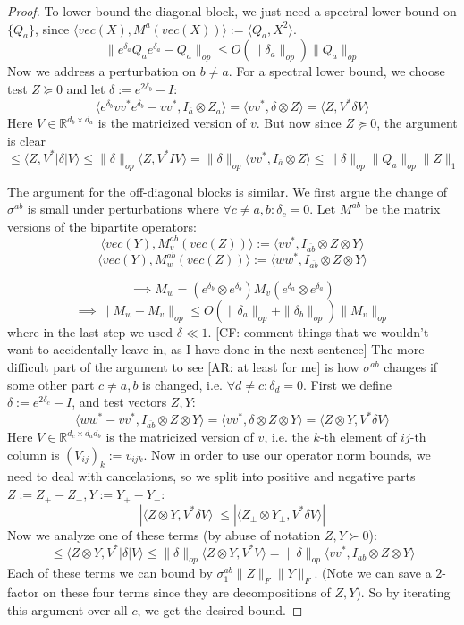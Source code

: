 \documentclass{article}
\newcommand{\R}{{\mathbb{R}}}
\newcommand{\CF}[1]{{\color{purple}[CF: #1]}}
\newcommand{\AR}[1]{{\color{orange}[AR: #1]}}
\begin{document}
\begin{proof}
To lower bound the diagonal block, we just need a spectral lower bound on $\{Q_{a}\}$, since $\langle vec(X), M^{a} (vec(X)) \rangle := \langle Q_{a}, X^{2} \rangle$.
\[ \| e^{\delta_{a}} Q_{a} e^{\delta_{a}} - Q_{a}\|_{op} \leq O(\|\delta_{a}\|_{op}) \|Q_{a}\|_{op}   \]
Now we address a perturbation on $b \neq a$. For a spectral lower bound, we choose test $Z \succeq 0$ and let $\delta := e^{2\delta_{b}} - I$:
\[ \langle e^{\delta_{b}} v v^{*} e^{\delta_{b}} - v v^{*}, I_{\overline{a}} \otimes Z_{a} \rangle
= \langle v v^{*}, \delta \otimes Z \rangle = \langle Z, V^{*} \delta V \rangle   \]
Here $V \in \R^{d_{b} \times d_{a}}$ is the matricized version of $v$. But now since $Z \succeq 0$, the argument is clear
\[ \leq \langle Z, V^{*} |\delta| V \rangle \leq \|\delta\|_{op} \langle Z, V^{*} I V \rangle = \|\delta\|_{op} \langle v v^{*}, I_{\overline{a}} \otimes Z \rangle \leq \|\delta\|_{op} \|Q_{a}\|_{op} \|Z\|_{1}    \]

The argument for the off-diagonal blocks is similar. We first argue the change of $\sigma^{ab}$ is small under perturbations where $\forall c \neq a,b: \delta_{c} = 0$. Let $M^{ab}$ be the matrix versions of the bipartite operators:
\[ \langle vec(Y), M_{v}^{ab}(vec(Z)) \rangle := \langle v v^{*}, I_{\overline{ab}} \otimes Z \otimes Y \rangle \]
\[ \langle vec(Y), M_{w}^{ab}(vec(Z)) \rangle := \langle w w^{*}, I_{\overline{ab}} \otimes Z \otimes Y \rangle\]

\[ \implies M_{w} = (e^{\delta_{b}} \otimes e^{\delta_{b}}) M_{v} (e^{\delta_{a}} \otimes e^{\delta_{a}})   \]
\[ \implies \|M_{w} - M_{v}\|_{op} \leq O(\|\delta_{a}\|_{op} + \|\delta_{b}\|_{op}) \|M_{v}\|_{op}   \]
where in the last step we used $\delta \ll 1$.
\CF{comment things that we wouldn't want to accidentally leave in, as I have done in the next sentence}
The more difficult part of the argument to see \AR{at least for me} is how $\sigma^{ab}$ changes if some other part $c \neq a,b$ is changed, i.e. $\forall d \neq c: \delta_{d} = 0$. First we define $\delta := e^{2 \delta_{c}} - I$, and test vectors $Z,Y$:
\[ \langle w w^{*} - v v^{*}, I_{\overline{ab}} \otimes Z \otimes Y \rangle = \langle v v^{*}, \delta \otimes Z \otimes Y \rangle  = \langle Z \otimes Y, V^{*} \delta V \rangle \]
Here $V \in \R^{d_{c} \times d_{a}d_{b}}$ is the matricized version of $v$, i.e. the $k$-th element of $ij$-th column is $(V_{ij})_{k} := v_{ijk}$. Now in order to use our operator norm bounds, we need to deal with cancelations, so we split into positive and negative parts $Z := Z_{+} - Z_{-}, Y := Y_{+} - Y_{-}$:
\[ |\langle Z \otimes Y, V^{*} \delta V \rangle| \leq |\langle Z_{\pm} \otimes Y_{\pm}, V^{*} \delta V \rangle |  \]
Now we analyze one of these terms (by abuse of notation $Z, Y \succ 0$):
\[ \leq \langle Z \otimes Y, V^{*} |\delta| V \rangle \leq \|\delta\|_{op} \langle Z \otimes Y, V^{*} V \rangle = \|\delta\|_{op} \langle v v^{*}, I_{\overline{ab}} \otimes Z \otimes Y \rangle   \]
Each of these terms we can bound by $\sigma^{ab}_{1} \|Z\|_{F} \|Y\|_{F}$. (Note we can save a $2$-factor on these four terms since they are decompositions of $Z,Y$). So by iterating this argument over all $c$, we get the desired bound.
\end{proof}
\end{document}
